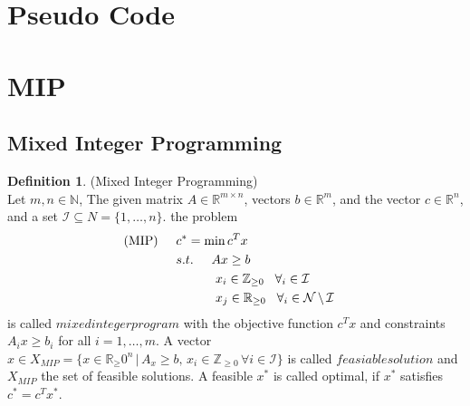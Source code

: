 \documentclass[11pt]{article}
\theoremstyle{definition}
\newtheorem{definition}{Definition}[section] %
\begin{document}
\section{Pseudo Code}


\section{MIP}
\subsection{Mixed Integer Programming}
\begin{definition}
(Mixed Integer Programming)\\
Let $m,n \in \mathbb{N}$, The given matrix $A\in \mathbb{R}^{m \times n}$, vectors $b\in \mathbb{R}^m$, and the vector $c \in \mathbb{R}^n$, and a set $\mathcal{I} \subseteq N = \{ 1,\dots,n \} $. the problem 
\begin{align*}
\text{(MIP)} \hspace{5mm} &c^* = \text{min}\,c^Tx& \\
&s.t.\hspace{5mm} Ax \geq b  \\
&\hspace{11mm} x_i \in \mathbb{Z}_{\geq0} \hspace{3mm} \forall_i \in \mathcal{I}\\ 
&\hspace{11mm} x_j \in \mathbb{R}_{\geq0} \hspace{3mm} \forall_i \in \mathcal{N}\,\backslash\,  \mathcal{I}
\end{align*}
is called $mixed integer program$ with the objective function $c^Tx$ and constraints $A_ix \geq b_i$ for all $i = 1,\dots ,m$.
A vector $x\in X_{MIP} = \{x \in \mathbb{R}_\geq0^n\,|\,A_x \geq b, \, x_i \in \mathbb{Z}_{\geq0}\,\forall i \in \mathcal{I}  \}$ is called $feasiable solution$ and $X_{MIP}$ the set of feasible solutions. A feasible $x^*$ is called optimal, if $x^*$ satisfies $c^*=c^Tx^*$.

\end{definition}
\end{document}

